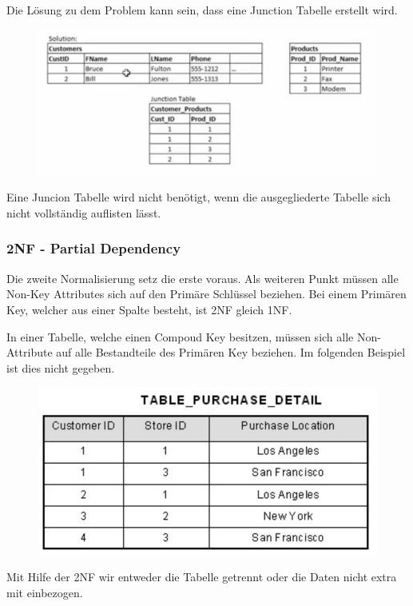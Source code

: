Die Lösung zu dem Problem kann sein, dass eine Junction Tabelle erstellt wird.

\begin{figure}[H]
	\centering
	\includegraphics[scale = 0.3]{attachment/chapter_3/Scc035}
	\caption{}
	\label{fig:Scc035}
\end{figure}
Eine Juncion Tabelle wird nicht benötigt, wenn die ausgegliederte Tabelle sich nicht vollständig auflisten lässt.

\subsubsection{2NF - Partial Dependency}
Die zweite Normalisierung setz die erste voraus. Als weiteren Punkt müssen alle Non-Key Attributes sich auf den Primäre Schlüssel beziehen. Bei einem Primären Key, welcher aus einer Spalte besteht, ist 2NF gleich 1NF. 

In einer Tabelle, welche einen Compoud Key besitzen, müssen sich alle Non-Attribute auf alle Bestandteile des Primären Key beziehen. Im folgenden Beispiel ist dies nicht gegeben.

\begin{figure}[H]
	\centering
	\includegraphics[scale = 0.3]{attachment/chapter_3/Scc036}
	\caption{}
	\label{fig:Scc036}
\end{figure}
Mit Hilfe der 2NF wir entweder die Tabelle getrennt oder die Daten nicht extra mit einbezogen.

